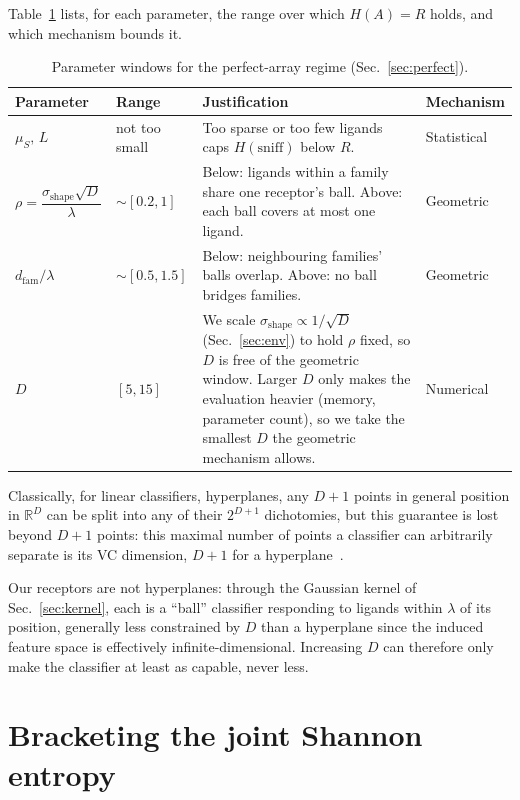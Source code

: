 \documentclass[aps,pre,superscriptaddress,floatfix,longbibliography,linenumbers]{revtex4-2}
\begin{document}
Table~\ref{tab:param_windows} lists, for each parameter, the range over
which $H(A)=R$ holds, and which mechanism bounds it.

\begin{table}[t]
\centering
\begin{tabular}{p{2.2cm}p{2.6cm}p{5.2cm}p{2.0cm}}
Parameter & Range & Justification & Mechanism \\
\hline
$\mu_S,\,L$ & not too small & Too sparse or too few ligands caps
$H(\text{sniff})$ below $R$. & Statistical \\[6pt]
$\rho=\dfrac{\sigma_\text{shape}\sqrt{D}}{\lambda}$ & $\sim[0.2,1]$ &
Below: ligands within a family share one receptor's ball. Above: each ball
covers at most one ligand. & Geometric \\[6pt]
$d_\text{fam}/\lambda$ & $\sim[0.5,1.5]$ & Below: neighbouring families'
balls overlap. Above: no ball bridges families. & Geometric \\[6pt]
$D$ & $[5,15]$ & We scale $\sigma_\text{shape}\propto1/\sqrt D$
(Sec.~\ref{sec:env}) to hold $\rho$ fixed, so $D$ is free of the geometric
window. Larger $D$ only makes the evaluation heavier (memory, parameter
count), so we take the smallest $D$ the geometric mechanism allows. &
Numerical \\
\end{tabular}
\caption{Parameter windows for the perfect-array regime
(Sec.~\ref{sec:perfect}).}
\label{tab:param_windows}
\end{table}

Classically, for linear classifiers, hyperplanes, any $D+1$ points in
general position in $\mathbb{R}^D$ can be split into any of their
$2^{D+1}$ dichotomies, but this guarantee is lost beyond $D+1$ points: this
maximal number of points a classifier can arbitrarily separate is its VC
dimension, $D+1$ for a hyperplane~\cite{cover_geometrical_1965}.

Our receptors are not hyperplanes: through the Gaussian kernel of
Sec.~\ref{sec:kernel}, each is a ``ball'' classifier responding to ligands
within $\lambda$ of its position, generally less constrained by $D$ than a
hyperplane since the induced feature space is effectively
infinite-dimensional. Increasing $D$ can therefore only make the
classifier at least as capable, never less.

\section{Bracketing the joint Shannon entropy}
\label{sec:entropy}
\end{document}
